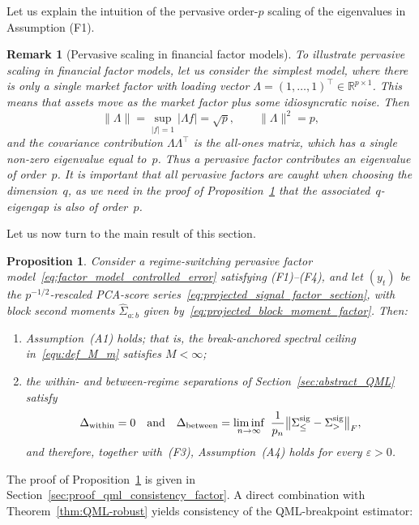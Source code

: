 \documentclass[10pt, letterpaper]{amsart}
\def\R{{\mathbb{R}}}
\newtheorem{proposition}[theorem]{Proposition}
\newtheorem{remark}[theorem]{Remark}
\begin{document}
Let us explain the intuition of the pervasive order-$p$ scaling of the eigenvalues in Assumption (F1).
\begin{remark}[Pervasive scaling in financial factor models]\label{rem:pervasive_scale}
To illustrate pervasive scaling in financial factor models, let us consider the simplest model, where there is only a single market factor with loading vector $\Lambda=(1,\dots,1)^{\top}\in\R^{p\times1}$. This means that assets move as the market factor plus some idiosyncratic noise. Then
\[
\|\Lambda\|=\sup_{|f|=1}|\Lambda f|=\sqrt p,\qquad \|\Lambda\|^2=p,
\]
and the covariance contribution $\Lambda\Lambda^{\top}$ is the all-ones matrix, which has a single non-zero eigenvalue equal to~$p$. Thus a pervasive factor contributes an eigenvalue of order~$p$. It is important that all pervasive factors are caught when choosing the dimension~$q$, as we need in the proof of Proposition~\ref{prop:projected_slln_factor} that the associated~$q$-eigengap is also of order~$p$. 
\end{remark}

Let us now turn to the main result of this section.

\begin{proposition}\label{prop:projected_slln_factor}
Consider a regime-switching pervasive factor model~\eqref{eq:factor_model_controlled_error} satisfying \textup{(F1)--(F4)}, and let $(y_t)$ be the  $p^{-1/2}$-rescaled PCA-score series~\eqref{eq:projected_signal_factor_section}, with  block second moments $\widehat\Sigma_{a:b}$ given by~\eqref{eq:projected_block_moment_factor}. Then:
\begin{enumerate}[label=\textup{(\roman*)}]
  \item Assumption~\textup{(A1)} holds; that is, the
  break-anchored spectral ceiling in~\eqref{equ:def_M_m} satisfies $M<\infty$;
  \item the within- and between-regime separations of Section~\ref{sec:abstract_QML} satisfy
  \[
  \Delta_{\textup{within}}=0
  \quad\text{and}\quad
  \Delta_{\textup{between}}=  \liminf_{n\to\infty}\ \frac{1}{p_n}\bigl\| \Sigma_\le^{\rm sig}-\Sigma_>^{\rm sig}\bigr\|_F ,
\]
and therefore, together with~\textup{(F3)}, Assumption~\textup{(A4)} holds for every $\varepsilon>0$.
\end{enumerate}
\end{proposition}

The proof of Proposition~\ref{prop:projected_slln_factor} is given in Section~\ref{sec:proof_qml_consistency_factor}. A direct combination with Theorem~\ref{thm:QML-robust} yields consistency of the QML-breakpoint estimator:
\end{document}
